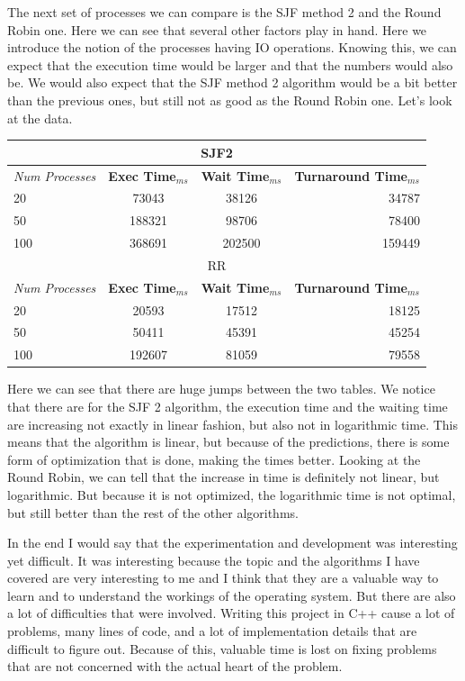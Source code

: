 \documentclass{article}
\begin{document}
The next set of processes we can compare is the SJF method 2 and the Round Robin one. Here we can see that several other factors play in hand. Here we introduce the notion of the processes having IO operations. Knowing this, we can expect that the execution time would be larger and that the numbers would also be. We would also expect that the SJF method 2 algorithm would be a bit better than the previous ones, but still not as good as the Round Robin one. Let's look at the data.

\begin{center}
  \begin{tabular}{l|c|c|r}
    \multicolumn{4}{c}{SJF2} \\
    \toprule
    \textit{Num Processes} & \textbf{Exec Time}$_{ms}$ & \textbf{Wait Time}$_{ms}$ & \textbf{Turnaround Time}$_{ms}$ \\
    \midrule
    20 & 73043 & 38126 & 34787 \\ \hline
    50 & 188321 & 98706 & 78400 \\ \hline
    100 & 368691 & 202500 & 159449 \\
    \bottomrule
    \toprule
    \multicolumn{4}{c}{RR} \\
    \toprule
    \textit{Num Processes} & \textbf{Exec Time}$_{ms}$ & \textbf{Wait Time}$_{ms}$ & \textbf{Turnaround Time}$_{ms}$ \\
    \midrule
    20 & 20593 & 17512 & 18125 \\ \hline
    50 & 50411 & 45391 & 45254 \\ \hline
    100 & 192607 & 81059 & 79558 \\
    \bottomrule
    \toprule
  \end{tabular}
\end{center}

Here we can see that there are huge jumps between the two tables. We notice that there are for the SJF 2 algorithm, the execution time and the waiting time are increasing not exactly in linear fashion, but also not in logarithmic time. This means that the algorithm is linear, but because of the predictions, there is some form of optimization that is done, making the times better. Looking at the Round Robin, we can tell that the increase in time is definitely not linear, but logarithmic. But because it is not optimized, the logarithmic time is not optimal, but still better than the rest of the other algorithms.

In the end I would say that the experimentation and development was interesting yet difficult. It was interesting because the topic and the algorithms I have covered are very interesting to me and I think that they are a valuable way to learn and to understand the workings of the operating system. But there are also a lot of difficulties that were involved. Writing this project in C++ cause a lot of problems, many lines of code, and a lot of implementation details that are difficult to figure out. Because of this, valuable time is lost on fixing problems that are not concerned with the actual heart of the problem.
\end{document}
